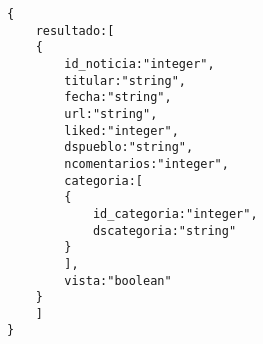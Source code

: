 \begin{description}
\begin{lstlisting}
{
	resultado:[
	{
		id_noticia:"integer",
		titular:"string",
		fecha:"string",
		url:"string",
		liked:"integer",
		dspueblo:"string",
		ncomentarios:"integer",
		categoria:[
		{
			id_categoria:"integer",
			dscategoria:"string"
		}
		],
		vista:"boolean"
	}
	]
}
\end{lstlisting}

\end{description}

